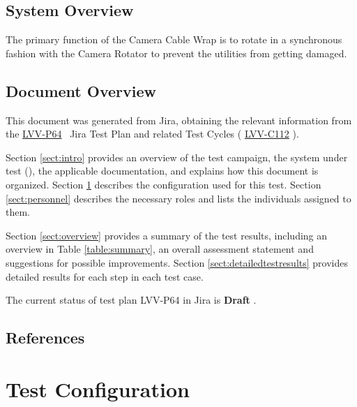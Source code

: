 \documentclass[SE,lsstdraft,STR,toc]{lsstdoc}
\begin{document}
\subsection{System Overview}
\label{sect:systemoverview}

The primary function of the Camera Cable Wrap is to rotate in a
synchronous fashion with the Camera Rotator to prevent the utilities
from getting damaged.


\subsection{Document Overview}
\label{sect:docoverview}

This document was generated from Jira, obtaining the relevant information from the 
\href{https://jira.lsstcorp.org/secure/Tests.jspa#/testPlan/LVV-P64}{LVV-P64}
~Jira Test Plan and related Test Cycles (
  \href{https://jira.lsstcorp.org/secure/Tests.jspa#/testCycle/LVV-C112}{LVV-C112}
).

Section \ref{sect:intro} provides an overview of the test campaign, the system under test (\product{}), the applicable documentation, and explains how this document is organized.
Section \ref{sect:configuration}  describes the configuration used for this test.
Section \ref{sect:personnel} describes the necessary roles and lists the individuals assigned to them.

Section \ref{sect:overview} provides a summary of the test results, including an overview in Table \ref{table:summary}, an overall assessment statement and suggestions for possible improvements.
Section \ref{sect:detailedtestresults} provides detailed results for each step in each test case.

The current status of test plan LVV-P64 in Jira is \textbf{ Draft }.

\subsection{References}
\label{sect:references}
\renewcommand{\refname}{}

\section{Test Configuration}
\label{sect:configuration}
\end{document}

